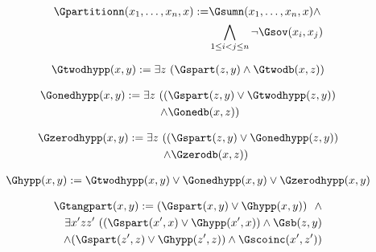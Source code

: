 \begin{erin}
    \begin{align*}
        \Gpartitionn(x_{1},\ldots,x_{n},x) := &\Gsumn(x_{1},\ldots,x_{n},x) \wedge\\ &\bigwedge_{1 \leq i < j \leq n} \neg\Gsov(x_i,x_j)
    \end{align*}
\end{erin}

\begin{erin}
    \begin{align*}
        \Gtwodhypp(x,y) := \exists z\ (\Gspart(z,y) \wedge \Gtwodb(x,z))
    \end{align*}
\end{erin}

\begin{erin}
    \begin{align*}
        \Gonedhypp(x,y) := \exists z\ ((&\Gspart(z,y) \vee \Gtwodhypp(z,y))\\
        \wedge  &\Gonedb(x,z))
    \end{align*}
\end{erin}

\begin{erin}
    \begin{align*}
        \Gzerodhypp(x,y) := \exists z\ ((&\Gspart(z,y) \vee \Gonedhypp(z,y))\\ 
        \wedge  &\Gzerodb(x,z))
    \end{align*}
\end{erin}
               
\begin{erin}
    \begin{align*}
        \Ghypp(x,y) := \Gtwodhypp(x,y) \vee \Gonedhypp(x,y) \vee \Gzerodhypp(x,y)
    \end{align*}
\end{erin}
  
\begin{erin}
    \begin{align*}
        \Gtangpart(x,y) := (\Gspart(x,y) \vee \Ghypp(x,y))\ \ \wedge\\
        \exists x'zz'\ ((\Gspart(x',x) \vee \Ghypp(x',x)) \wedge 
        \Gsb(z,y) \\
        \wedge (\Gspart(z',z) \vee \Ghypp(z',z)) \wedge \Gscoinc(x',z'))
    \end{align*}
\end{erin}

